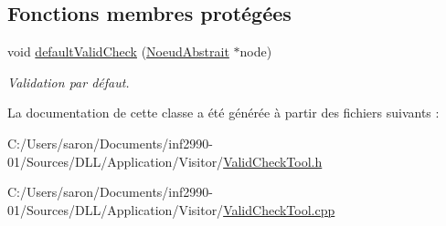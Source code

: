 \subsection*{Fonctions membres protégées}
\begin{DoxyCompactItemize}
\item 
\hypertarget{group__inf2990_ga58a361b0ca91a2b7acb338d39bc0172a}{void \hyperlink{group__inf2990_ga58a361b0ca91a2b7acb338d39bc0172a}{default\-Valid\-Check} (\hyperlink{class_noeud_abstrait}{Noeud\-Abstrait} $\ast$node)}\label{group__inf2990_ga58a361b0ca91a2b7acb338d39bc0172a}

\begin{DoxyCompactList}\small\item\em Validation par défaut. \end{DoxyCompactList}\end{DoxyCompactItemize}


La documentation de cette classe a été générée à partir des fichiers suivants \-:\begin{DoxyCompactItemize}
\item 
C\-:/\-Users/saron/\-Documents/inf2990-\/01/\-Sources/\-D\-L\-L/\-Application/\-Visitor/\hyperlink{_valid_check_tool_8h}{Valid\-Check\-Tool.\-h}\item 
C\-:/\-Users/saron/\-Documents/inf2990-\/01/\-Sources/\-D\-L\-L/\-Application/\-Visitor/\hyperlink{_valid_check_tool_8cpp}{Valid\-Check\-Tool.\-cpp}\end{DoxyCompactItemize}
